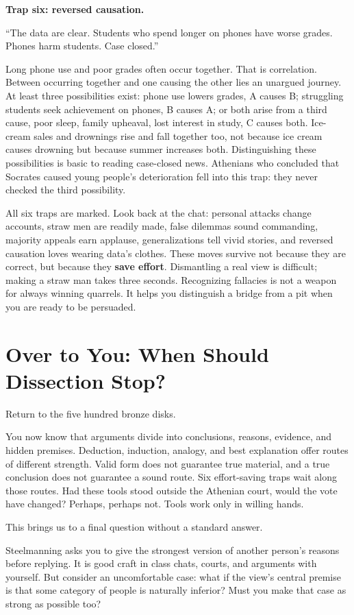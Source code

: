 \textbf{Trap six: reversed causation.}

``The data are clear. Students who spend longer on phones have worse grades. Phones harm students. Case closed.''

Long phone use and poor grades often occur together. That is correlation. Between occurring together and one causing the other lies an unargued journey. At least three possibilities exist: phone use lowers grades, A causes B; struggling students seek achievement on phones, B causes A; or both arise from a third cause, poor sleep, family upheaval, lost interest in study, C causes both. Ice-cream sales and drownings rise and fall together too, not because ice cream causes drowning but because summer increases both. Distinguishing these possibilities is basic to reading case-closed news. Athenians who concluded that Socrates caused young people's deterioration fell into this trap: they never checked the third possibility.

All six traps are marked. Look back at the chat: personal attacks change accounts, straw men are readily made, false dilemmas sound commanding, majority appeals earn applause, generalizations tell vivid stories, and reversed causation loves wearing data's clothes. These moves survive not because they are correct, but because they \textbf{save effort}. Dismantling a real view is difficult; making a straw man takes three seconds. Recognizing fallacies is not a weapon for always winning quarrels. It helps you distinguish a bridge from a pit when you are ready to be persuaded.

\section{Over to You: When Should Dissection Stop?}
Return to the five hundred bronze disks.

You now know that arguments divide into conclusions, reasons, evidence, and hidden premises. Deduction, induction, analogy, and best explanation offer routes of different strength. Valid form does not guarantee true material, and a true conclusion does not guarantee a sound route. Six effort-saving traps wait along those routes. Had these tools stood outside the Athenian court, would the vote have changed? Perhaps, perhaps not. Tools work only in willing hands.

This brings us to a final question without a standard answer.

Steelmanning asks you to give the strongest version of another person's reasons before replying. It is good craft in class chats, courts, and arguments with yourself. But consider an uncomfortable case: what if the view's central premise is that some category of people is naturally inferior? Must you make that case as strong as possible too?

